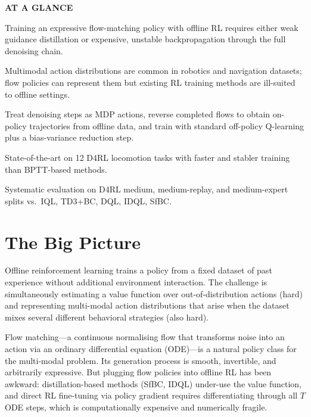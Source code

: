 \documentclass[10pt,twocolumn]{article}
\begin{document}
\begin{mdframed}[backgroundcolor=boxgray,linecolor=rulered,linewidth=1pt,
    innerleftmargin=6pt,innerrightmargin=6pt,
    innertopmargin=6pt,innerbottommargin=6pt]
\textbf{\small AT A GLANCE}\par\vspace{4pt}
\begin{description}[leftmargin=0pt,labelsep=4pt,itemsep=2pt,parsep=0pt,
    font=\small\bfseries]
  \item[Problem:] Training an expressive flow-matching policy with offline RL
    requires either weak guidance distillation or expensive, unstable backpropagation
    through the full denoising chain.
  \item[Why it matters:] Multimodal action distributions are common in robotics and
    navigation datasets; flow policies can represent them but existing RL training
    methods are ill-suited to offline settings.
  \item[Method:] Treat denoising steps as MDP actions, reverse completed flows to
    obtain on-policy trajectories from offline data, and train with standard
    off-policy Q-learning plus a bias-variance reduction step.
  \item[Result:] State-of-the-art on 12 D4RL locomotion tasks with faster and
    stabler training than BPTT-based methods.
  \item[Evidence:] Systematic evaluation on D4RL medium, medium-replay,
    and medium-expert splits vs.\ IQL, TD3+BC, DQL, IDQL, SfBC.
\end{description}
\end{mdframed}

\section{The Big Picture}

Offline reinforcement learning trains a policy from a fixed dataset of past
experience without additional environment interaction. The challenge is
simultaneously estimating a value function over out-of-distribution actions
(hard) and representing multi-modal action distributions that arise when the
dataset mixes several different behavioral strategies (also hard).

Flow matching---a continuous normalising flow that transforms noise into an
action via an ordinary differential equation (ODE)---is a natural policy class
for the multi-modal problem. Its generation process is smooth, invertible, and
arbitrarily expressive. But plugging flow policies into offline RL has been
awkward: distillation-based methods (SfBC, IDQL) under-use the value function,
and direct RL fine-tuning via policy gradient requires differentiating through
all $T$ ODE steps, which is computationally expensive and numerically fragile.
\end{document}
